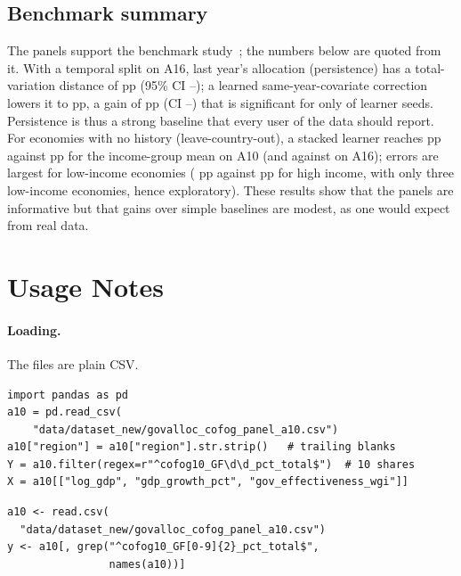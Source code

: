 \documentclass[11pt,a4paper]{article}
\DeclareRobustCommand*{\_}{\textunderscore\hskip0pt\relax}
\begin{document}
\subsection{Benchmark summary}
The panels support the benchmark study~\cite{govallocxai_benchmark}; the numbers below are quoted from it. With a temporal split on A16, last year's allocation (persistence) has a total-variation distance of \DBmResTVDPersist{} pp (95\% CI \DBmResTVDPersistLo--\DBmResTVDPersistHi); a learned same-year-covariate correction lowers it to \DBmResTVDHyb{} pp, a gain of \DBmResPairedGain{} pp (CI \DBmResPairedLo--\DBmResPairedHi) that is significant for only \DBmAnnSeedNExcl{} of \DBmAnnSeedN{} learner seeds. Persistence is thus a strong baseline that every user of the data should report. For economies with no history (leave-country-out), a stacked learner reaches \DBmColdStackTen{} pp against \DBmColdPeerTen{} pp for the income-group mean on A10 (and \DBmColdStackSixteen{} against \DBmColdPeerSixteen{} on A16); errors are largest for low-income economies (\DBmErrLow{} pp against \DBmErrHigh{} pp for high income, with only three low-income economies, hence exploratory). These results show that the panels are informative but that gains over simple baselines are modest, as one would expect from real data.

\section{Usage Notes}\label{sec:usage}
\paragraph{Loading.} The files are plain CSV.
\begin{verbatim}
import pandas as pd
a10 = pd.read_csv(
    "data/dataset_new/govalloc_cofog_panel_a10.csv")
a10["region"] = a10["region"].str.strip()   # trailing blanks
Y = a10.filter(regex=r"^cofog10_GF\d\d_pct_total$")  # 10 shares
X = a10[["log_gdp", "gdp_growth_pct", "gov_effectiveness_wgi"]]
\end{verbatim}
\begin{verbatim}
a10 <- read.csv(
  "data/dataset_new/govalloc_cofog_panel_a10.csv")
y <- a10[, grep("^cofog10_GF[0-9]{2}_pct_total$",
                names(a10))]
\end{verbatim}
\end{document}
